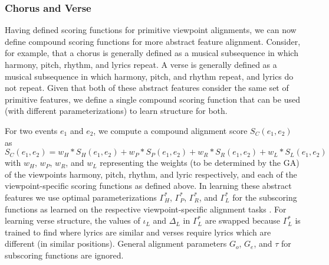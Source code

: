 \documentclass[phd,electronic,oneside,twosidetoc,letterpaper,chaptercenter,parttop,lof,lot]{byumsphd}
\begin{document}
\subsubsection{Chorus and Verse}

Having defined scoring functions for primitive viewpoint alignments, we can now define compound scoring functions for more abstract feature alignment. Consider, for example, that a chorus is generally defined as a musical subsequence in which harmony, pitch, rhythm, and lyrics repeat. A verse is generally defined as a musical subsequence in which harmony, pitch, and rhythm repeat, and lyrics do not repeat. Given that both of these abstract features consider the same set of primitive features, we define a single compound scoring function that can be used (with different parameterizations) to learn structure for both. 

For two events $e_1$ and $e_2$, we compute a compound alignment score $S_C(e_1,e_2)$ as
\[
S_C(e_1,e_2) = w_H * S_H(e_1,e_2) + w_P * S_P(e_1,e_2) + w_R * S_R(e_1,e_2) + w_L * S_L(e_1,e_2)
\]
\noindent with $w_H$, $w_P$, $w_R$, and $w_L$ representing the weights (to be determined by the GA) of the viewpoints harmony, pitch, rhythm, and lyric respectively, and each of the viewpoint-specific scoring functions as defined above. In learning these abstract features we use optimal parameterizations $\Gamma^*_H$, $\Gamma^*_P$, $\Gamma^*_R$, and $\Gamma^*_L$ for the subscoring functions as learned on the respective viewpoint-specific alignment tasks%
. For learning verse structure, the values of $\iota_L$ and $\Delta_L$ in $\Gamma^*_L$ are swapped because $\Gamma^*_L$ is trained to find where lyrics are similar and verses require lyrics which are different (in similar positions). General alignment parameters $G_o$, $G_e$, and $\tau$ for subscoring functions are ignored.
\end{document}
